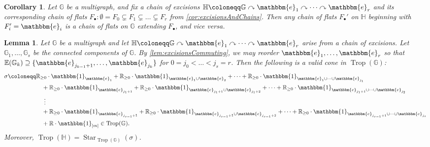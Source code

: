 \documentclass[11pt,reqno,a4paper]{amsart}
\theoremstyle{theoremstyle}
\newtheorem{lemma}[theorem]{Lemma}
\newtheorem{corollary}[theorem]{Corollary}
\theoremstyle{examplestyle}
\theoremstyle{algorithmstyle}
\newcommand{\EE}{\mathbb{E}}
\newcommand{\ee}{\mathbbm{e}}
\newcommand{\GG}{\mathbb{G}}
\newcommand{\HH}{\mathbb{H}}
\newcommand{\RR}{\mathbb{R}}
\newcommand{\bbone}{\mathbbm{1}}
\DeclareMathOperator{\Trop}{Trop}
\DeclareMathOperator{\Star}{Star}
\begin{document}
\begin{corollary}
  \label{cor:excisionsAndChains2}
  Let $\GG$ be a multigraph, and fix a chain of excisions $\HH\coloneqq \GG\curvearrowright\ee_1\curvearrowright\dots\curvearrowright\ee_r$ and its corresponding chain of flats $F_\bullet\colon \emptyset=F_0\subsetneq F_1\subsetneq\dots\subsetneq F_r$ from \cref{cor:excisionsAndChains}.  Then any chain of flats $F_\bullet'$ on $\HH$ beginning with $F_{i}'=\ee_i$ is a chain of flats on $\GG$ extending $F_\bullet$, and vice versa.
\end{corollary}


\begin{lemma}
  \label{lem:excisionToStar}
  Let $\GG$ be a multigraph and let $\HH\coloneqq \GG\curvearrowright\ee_1\curvearrowright\dots\curvearrowright\ee_r$ arise from a chain of excisions.  Let $\GG_1,\dots,\GG_s$ be the connected components of $\GG$.  By \cref{lem:excisionsCommuting}, we may reorder $\ee_1,\dots,\ee_r$ so that $\EE(\GG_k)\supseteq \{\ee_{j_{k-1}+1},\dots,\ee_{j_k}\}$ for $0=j_0<\dots<j_s=r$. Then the following is a valid cone in $\Trop(\GG)$:
  \begin{align*}
    \sigma \coloneqq &\RR_{\geq 0}\cdot \bbone_{\ee_1}+\RR_{\geq 0}\cdot \bbone_{\ee_1\cup\ee_2}+\dots+\RR_{\geq 0}\cdot \bbone_{\ee_1\cup\dots\cup\ee_{j_1}}\\
    &\quad +\RR_{\geq 0}\cdot \bbone_{\ee_{j_1+1}}+\RR_{\geq 0}\cdot \bbone_{\ee_{j_1+1}\cup\ee_{j_1+2}}+\dots+\RR_{\geq 0}\cdot \bbone_{\ee_{j_1+1}\cup\dots\cup\ee_{j_2}}\\
    &\hspace{4.75mm} \vdots\\
    &\quad +\RR_{\geq 0}\cdot \bbone_{\ee_{j_{s-1}+1}}+\RR_{\geq 0}\cdot \bbone_{\ee_{j_{s-1}+1}\cup\ee_{j_{s-1}+2}}+\dots+\RR_{\geq 0}\cdot \bbone_{\ee_{j_{s-1}+1}\cup\dots\cup\ee_{j_s}}\\
    &\quad +\RR\cdot\bbone_{[m]}\in \Trop(\GG).
  \end{align*}
  Moreover, $\Trop(\HH)=\Star_{\Trop(\GG)}(\sigma)$.
\end{lemma}
\end{document}
